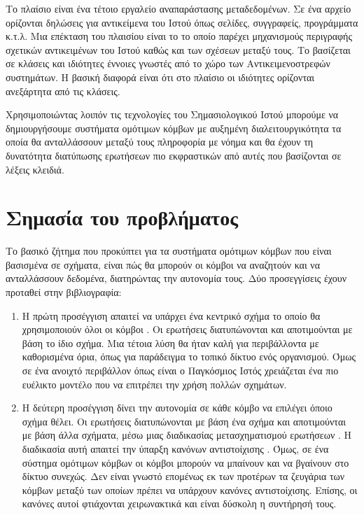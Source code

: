 Το πλαίσιο  είναι ένα τέτοιο εργαλείο αναπαράστασης
μεταδεδομένων. Σε ένα  αρχείο ορίζονται δηλώσεις για
αντικείμενα του Ιστού όπως σελίδες, συγγραφείς, προγράμματα κ.τ.λ.
Μια επέκταση του πλαισίου  είναι το  το
οποίο παρέχει μηχανισμούς περιγραφής σχετικών αντικειμένων του
Ιστού καθώς και των σχέσεων μεταξύ τους. Το 
βασίζεται σε κλάσεις και ιδιότητες έννοιες γνωστές από το χώρο των
Αντικειμενοστρεφών συστημάτων. Η βασική διαφορά είναι ότι στο
πλαίσιο  οι ιδιότητες ορίζονται ανεξάρτητα από τις
κλάσεις.

Χρησιμοποιώντας λοιπόν τις τεχνολογίες του Σημασιολογικού Ιστού
μπορούμε να δημιουργήσουμε συστήματα ομότιμων κόμβων με αυξημένη
διαλειτουργικότητα τα οποία θα ανταλλάσσουν μεταξύ τους πληροφορία
με νόημα και θα έχουν τη δυνατότητα διατύπωσης ερωτήσεων πιο
εκφραστικών από αυτές που βασίζονται σε λέξεις κλειδιά.


\section{Σημασία του προβλήματος}
Το βασικό ζήτημα που προκύπτει για τα συστήματα ομότιμων κόμβων
που είναι βασισμένα σε σχήματα, είναι πώς θα μπορούν οι κόμβοι να
αναζητούν και να ανταλλάσσουν δεδομένα, διατηρώντας την αυτονομία
τους. Δύο προσεγγίσεις έχουν προταθεί στην βιβλιογραφία:
\begin{enumerate}
\item Η πρώτη προσέγγιση απαιτεί να υπάρχει ένα κεντρικό σχήμα το
οποίο θα χρησιμοποιούν όλοι οι κόμβοι \cite{KokkinidisC04}. Οι
ερωτήσεις διατυπώνονται και αποτιμούνται με βάση το ίδιο σχήμα.
Μια τέτοια λύση θα ήταν καλή για περιβάλλοντα με καθορισμένα όρια,
όπως για παράδειγμα το τοπικό δίκτυο ενός οργανισμού. Όμως σε ένα
ανοιχτό περιβάλλον όπως είναι ο Παγκόσμιος Ιστός χρειάζεται ένα
πιο ευέλικτο μοντέλο που να επιτρέπει την χρήση πολλών σχημάτων.
\item Η δεύτερη προσέγγιση δίνει την αυτονομία σε κάθε κόμβο να επιλέγει όποιο σχήμα θέλει.
Οι ερωτήσεις διατυπώνονται με βάση ένα σχήμα και αποτιμούνται με
βάση άλλα σχήματα, μέσω μιας διαδικασίας μετασχηματισμού ερωτήσεων
. Η διαδικασία αυτή απαιτεί την ύπαρξη
κανόνων αντιστοίχισης  \cite{Piazza}. Όμως, σε
ένα σύστημα ομότιμων κόμβων οι κόμβοι μπορούν να μπαίνουν και να
βγαίνουν στο δίκτυο συνεχώς. Δεν είναι γνωστό επομένως εκ των
προτέρων τα ζευγάρια των κόμβων μεταξύ των οποίων πρέπει να
υπάρχουν κανόνες αντιστοίχισης. Επίσης, οι κανόνες αυτοί
φτιάχονται χειρωνακτικά και είναι δύσκολη η συντήρησή τους.
\end{enumerate}

